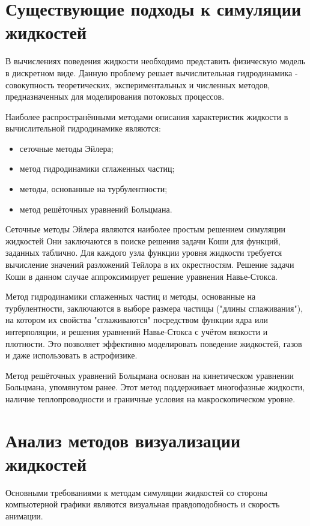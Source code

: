 \section{Существующие подходы к симуляции жидкостей}

В вычислениях поведения жидкости необходимо представить физическую модель в
 дискретном виде. Данную проблему решает вычислительная гидродинамика - совокупность
 теоретических, экспериментальных и численных методов, предназначенных для моделирования
 потоковых процессов.

Наиболее распространёнными методами описания характеристик жидкости в
вычислительной гидродинамике являются:
\begin{itemize}
    \item сеточные методы Эйлера;
    \item метод гидродинамики сглаженных частиц;
    \item методы, основанные на турбулентности;
    \item метод решёточных уравнений Больцмана.
\end{itemize}

Сеточные методы Эйлера являются наиболее простым решением симуляции жидкостей
Они заключаются в поиске решения задачи Коши для функций,
заданных таблично. Для каждого узла функции уровня жидкости
 требуется вычисление значений разложений Тейлора в их окрестностям. Решение задачи Коши
 в данном случае аппроксимирует решение уравнения Навье-Стокса\cite{book:compmath}.

Метод гидродинамики сглаженных частиц и методы, основанные на турбулентности,
заключаются в выборе размера частицы ("длины сглаживания"), на котором их свойства
"сглаживаются" посредством функции ядра или интерполяции, и решения уравнений
Навье-Стокса с учётом вязкости и плотности. Это позволяет эффективно моделировать
поведение жидкостей, газов и даже использовать в астрофизике\cite{site:astro}.

 Метод решёточных уравнений Больцмана основан на кинетическом уравнении Больцмана,
 упомянутом ранее. Этот метод поддерживает многофазные жидкости, наличие теплопроводности
 и граничные условия на макроскопическом уровне\cite{site:habr-physics}.

\section{Анализ методов визуализации жидкостей}

Основными требованиями к методам симуляции жидкостей со стороны компьютерной графики
являются визуальная правдоподобность и скорость анимации.

